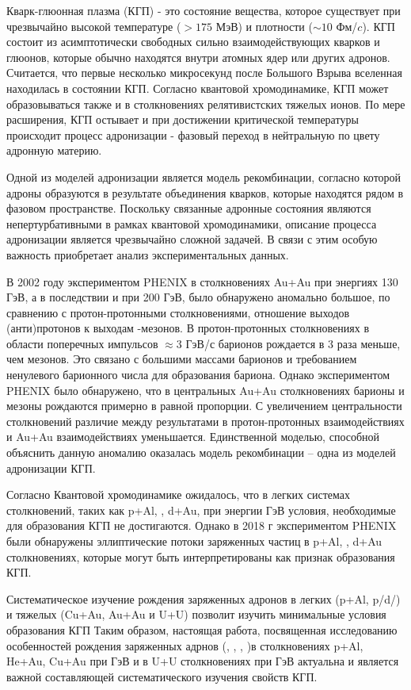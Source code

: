 {\actuality} Кварк-глюонная плазма (КГП) - это состояние вещества, которое существует при чрезвычайно высокой температуре ($>175$ МэВ) и плотности ($\sim 10$ Фм/$c$).  КГП состоит из асимптотически свободных сильно взаимодействующих кварков и глюонов, которые обычно находятся внутри атомных ядер или других адронов. Считается, что первые несколько микросекунд после Большого Взрыва вселенная находилась в состоянии КГП. Согласно квантовой хромодинамике, КГП может образовываться также и в столкновениях релятивистских тяжелых ионов. По мере расширения, КГП остывает и при достижении критической температуры происходит процесс адронизации - фазовый переход в нейтральную по цвету адронную материю.
\autocite{physica2020}

Одной из моделей адронизации является модель рекомбинации, согласно которой адроны образуются в результате объединения кварков, которые находятся рядом в фазовом пространстве. Поскольку связанные адронные состояния являются непертурбативными в рамках квантовой хромодинамики, описание процесса адронизации является чрезвычайно сложной задачей. В связи с этим особую важность приобретает анализ экспериментальных данных.

В 2002 году экспериментом PHENIX в столкновениях Au+Au при энергиях 130 ГэВ, а в последствии и при 200 ГэВ, было обнаружено аномально большое, по сравнению с протон-протонными столкновениями, отношение выходов (анти)протонов к выходам  \pipm-мезонов. В протон-протонных столкновениях в области поперечных импульсов \pt $\approx$3 ГэВ/с барионов рождается в 3 раза меньше, чем мезонов. Это связано с большими массами барионов и требованием ненулевого барионного числа для образования бариона. Однако экспериментом PHENIX было обнаружено, что в центральных Au+Au столкновениях барионы и мезоны рождаются примерно в равной пропорции. С увеличением центральности столкновений различие между результатами в протон-протонных взаимодействиях и Au+Au взаимодействиях уменьшается. Единственной моделью, способной объяснить данную аномалию оказалась модель рекомбинации – одна из моделей адронизации КГП.

Согласно Квантовой хромодинамике ожидалось, что в легких системах столкновений, таких как p+Al, \heau, d+Au, при энергии  ГэВ условия, необходимые для образования КГП не достигаются. Однако в 2018 г экспериментом PHENIX были обнаружены эллиптические потоки заряженных частиц в p+Al, \heau, d+Au столкновениях, которые могут быть интерпретированы как признак образования КГП. 

Систематическое изучение рождения заряженных адронов в легких (p+Al, p/d/\heau) и тяжелых (Cu+Au, Au+Au и U+U) позволит изучить минимальные условия образования КГП
Таким образом, настоящая работа, посвященная исследованию особенностей рождения заряженных адрнов (\pipm, \Kpm, \prot, \aprot )в столкновениях p+Al, He+Au, Cu+Au   при  ГэВ и в U+U столкновениях при  ГэВ актуальна и является важной составляющей систематического изучения свойств КГП.

